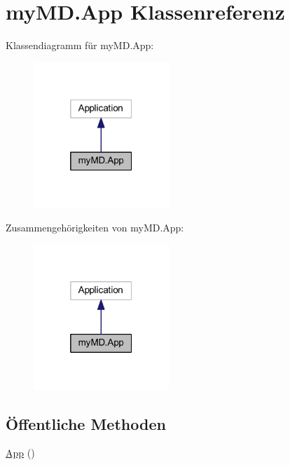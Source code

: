 \hypertarget{classmy_m_d_1_1_app}{}\section{my\+M\+D.\+App Klassenreferenz}
\label{classmy_m_d_1_1_app}


Klassendiagramm für my\+M\+D.\+App\+:
\nopagebreak
\begin{figure}[H]
\begin{center}
\leavevmode
\includegraphics[width=145pt]{classmy_m_d_1_1_app__inherit__graph}
\end{center}
\end{figure}


Zusammengehörigkeiten von my\+M\+D.\+App\+:
\nopagebreak
\begin{figure}[H]
\begin{center}
\leavevmode
\includegraphics[width=145pt]{classmy_m_d_1_1_app__coll__graph}
\end{center}
\end{figure}
\subsection*{Öffentliche Methoden}
\begin{DoxyCompactItemize}
\item 
\mbox{\hyperlink{classmy_m_d_1_1_app_aade00a34203636478b102999b7bb5c51}{App}} ()
\end{DoxyCompactItemize}
